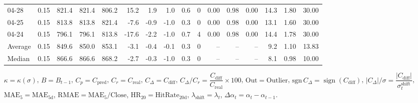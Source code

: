 \begin{threeparttable}
{\begin{tabular}{lrrrrrrrrrrrrrrr}
  04-28 &     0.15 & 821.4 & 821.4 & 806.2 &       15.2 &            1.9 &                      1.0 &                 0.6 &              0 &       0.00 &      0.98 &           0.00 &             14.3 &            1.80 &                  30.00 \\
  04-25 &     0.15 & 813.8 & 813.8 & 821.4 &       -7.6 &           -0.9 &                     -1.0 &                 0.3 &              0 &       0.00 &      0.98 &           0.00 &             13.1 &            1.60 &                  30.00 \\
  04-24 &     0.15 & 796.1 & 796.1 & 813.8 &      -17.6 &           -2.2 &                     -1.0 &                 0.7 &              4 &       0.00 &      0.98 &           0.00 &             14.4 &            1.78 &                  30.00 \\
Average &     0.15 & 849.6 & 850.0 & 853.1 &       -3.1 &           -0.4 &                     -0.1 &                 0.3 &              0 &         -- &        -- &             -- &              9.2 &            1.10 &                  13.83 \\
 Median &     0.15 & 866.6 & 866.6 & 868.2 &       -2.7 &           -0.3 &                     -1.0 &                 0.3 &              0 &         -- &        -- &             -- &              8.1 &            0.98 &                  10.00 \\
\bottomrule
\end{tabular}
}
\begin{tablenotes}\footnotesize
\item $\kappa=\kappa(\sigma)$, $B=B_{t-1}$, $C_p=C_{\text{pred}}$, $C_r=C_{\text{real}}$, $C_\Delta=C_{\text{diff}}$, $C_\Delta/C_r=\dfrac{C_{\text{diff}}}{C_{\text{real}}}\times100$, $\mathrm{Out}=\text{Outlier}$, $\mathrm{sgn}\,C_\Delta=\operatorname{sign}(C_{\text{diff}})$, $|C_\Delta|/\sigma=\dfrac{|C_{\text{diff}}|}{\sigma_t^{\text{shift}}}$, $\mathrm{MAE}_5=\mathrm{MAE}_{5\text{d}}$, $\mathrm{RMAE}= \mathrm{MAE}_5 / \text{Close}$, $\mathrm{HR}_{20}=\mathrm{HitRate}_{20\text{d}}$, 
$\lambda_{\text{shift}}=\lambda_t$, 
$\Delta\alpha_t=\alpha_t-\alpha_{t-1}$.
\end{tablenotes}
\end{threeparttable}
\endgroup

